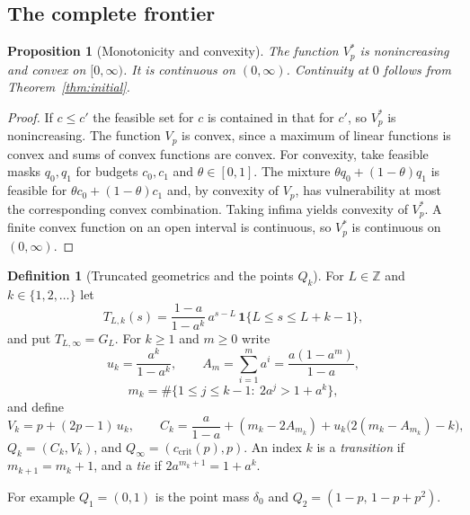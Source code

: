 \documentclass{article}
\newtheorem{proposition}[theorem]{Proposition}
\theoremstyle{definition}
\newtheorem{definition}[theorem]{Definition}
\theoremstyle{remark}
\newcommand{\Z}{\mathbb{Z}}
\newcommand{\ccrit}{c_{\mathrm{crit}}}
\begin{document}
\subsection{The complete frontier}
\begin{proposition}[Monotonicity and convexity]\label{prop:convex}
The function \(V_p^*\) is nonincreasing and convex on \([0,\infty)\). It is continuous on \((0,\infty)\). Continuity at \(0\) follows from Theorem~\ref{thm:initial}.
\end{proposition}
\begin{proof}
If \(c\le c'\) the feasible set for \(c\) is contained in that for \(c'\), so \(V_p^*\) is nonincreasing. The function \(V_p\) is convex, since a maximum of linear functions is convex and sums of convex functions are convex. For convexity, take feasible masks \(q_0,q_1\) for budgets \(c_0,c_1\) and \(\theta\in[0,1]\). The mixture \(\theta q_0+(1-\theta)q_1\) is feasible for \(\theta c_0+(1-\theta)c_1\) and, by convexity of \(V_p\), has vulnerability at most the corresponding convex combination. Taking infima yields convexity of \(V_p^*\). A finite convex function on an open interval is continuous, so \(V_p^*\) is continuous on \((0,\infty)\).
\end{proof}

\begin{definition}[Truncated geometrics and the points \(Q_k\)]\label{def:Q}
For \(L\in\Z\) and \(k\in\{1,2,\dots\}\) let
\[
T_{L,k}(s)=\frac{1-a}{1-a^k}\,a^{s-L}\,\mathbf 1\{L\le s\le L+k-1\},
\]
and put \(T_{L,\infty}=G_L\). For \(k\ge1\) and \(m\ge0\) write
\[
u_k=\frac{a^k}{1-a^k},\qquad A_m=\sum_{i=1}^m a^i=\frac{a(1-a^m)}{1-a},
\]
\[
m_k=\#\{1\le j\le k-1:\ 2a^j>1+a^k\},
\]
and define
\[
V_k=p+(2p-1)\,u_k,\qquad C_k=\frac{a}{1-a}+(m_k-2A_{m_k})+u_k\bigl(2(m_k-A_{m_k})-k\bigr),
\]
\(Q_k=(C_k,V_k)\), and \(Q_\infty=(\ccrit(p),p)\). An index \(k\) is a \emph{transition} if \(m_{k+1}=m_k+1\), and a \emph{tie} if \(2a^{m_k+1}=1+a^k\).
\end{definition}

For example \(Q_1=(0,1)\) is the point mass \(\delta_0\) and \(Q_2=(1-p,\,1-p+p^2)\).
\end{document}
